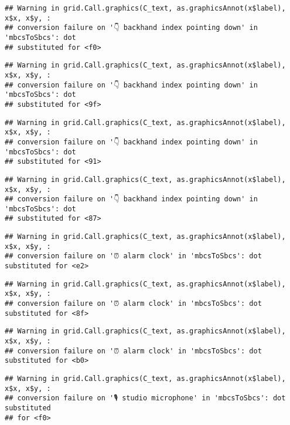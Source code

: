 \documentclass[
]{article}
\begin{document}
\begin{verbatim}
## Warning in grid.Call.graphics(C_text, as.graphicsAnnot(x$label), x$x, x$y, :
## conversion failure on '👇 backhand index pointing down' in 'mbcsToSbcs': dot
## substituted for <f0>
\end{verbatim}

\begin{verbatim}
## Warning in grid.Call.graphics(C_text, as.graphicsAnnot(x$label), x$x, x$y, :
## conversion failure on '👇 backhand index pointing down' in 'mbcsToSbcs': dot
## substituted for <9f>
\end{verbatim}

\begin{verbatim}
## Warning in grid.Call.graphics(C_text, as.graphicsAnnot(x$label), x$x, x$y, :
## conversion failure on '👇 backhand index pointing down' in 'mbcsToSbcs': dot
## substituted for <91>
\end{verbatim}

\begin{verbatim}
## Warning in grid.Call.graphics(C_text, as.graphicsAnnot(x$label), x$x, x$y, :
## conversion failure on '👇 backhand index pointing down' in 'mbcsToSbcs': dot
## substituted for <87>
\end{verbatim}

\begin{verbatim}
## Warning in grid.Call.graphics(C_text, as.graphicsAnnot(x$label), x$x, x$y, :
## conversion failure on '⏰ alarm clock' in 'mbcsToSbcs': dot substituted for <e2>
\end{verbatim}

\begin{verbatim}
## Warning in grid.Call.graphics(C_text, as.graphicsAnnot(x$label), x$x, x$y, :
## conversion failure on '⏰ alarm clock' in 'mbcsToSbcs': dot substituted for <8f>
\end{verbatim}

\begin{verbatim}
## Warning in grid.Call.graphics(C_text, as.graphicsAnnot(x$label), x$x, x$y, :
## conversion failure on '⏰ alarm clock' in 'mbcsToSbcs': dot substituted for <b0>
\end{verbatim}

\begin{verbatim}
## Warning in grid.Call.graphics(C_text, as.graphicsAnnot(x$label), x$x, x$y, :
## conversion failure on '🎙 studio microphone' in 'mbcsToSbcs': dot substituted
## for <f0>
\end{verbatim}
\end{document}
